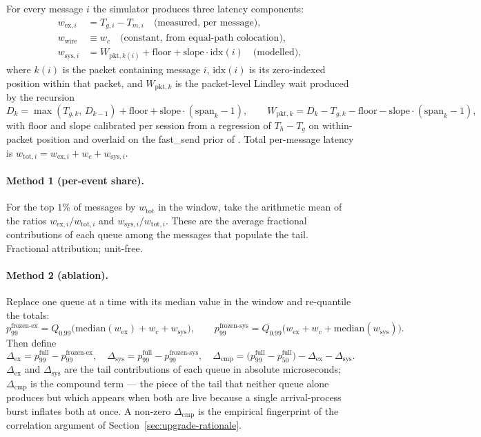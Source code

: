 \documentclass[11pt]{article}
\begin{document}
For every message $i$ the simulator produces three latency components:
\begin{align*}
w_{\mathrm{ex},i}   &= T_{g,i} - T_{m,i} \quad \text{(measured, per message)}, \\
w_{\mathrm{wire}}  &\equiv w_c \quad \text{(constant, from equal-path colocation)}, \\
w_{\mathrm{sys},i} &= W_{\mathrm{pkt},k(i)} + \text{floor} + \text{slope} \cdot \mathrm{idx}(i)\quad \text{(modelled)},
\end{align*}
where $k(i)$ is the packet containing message $i$, $\mathrm{idx}(i)$ is its zero-indexed position within that packet, and $W_{\mathrm{pkt},k}$ is the packet-level Lindley wait produced by the recursion
$$
D_k = \max(T_{g,k},\, D_{k-1}) + \text{floor} + \text{slope} \cdot (\text{span}_k - 1), \qquad W_{\mathrm{pkt},k} = D_k - T_{g,k} - \text{floor} - \text{slope}\cdot(\text{span}_k - 1),
$$
with floor and slope calibrated per session from a regression of $T_h - T_g$ on within-packet position and overlaid on the fast\_send prior of \citet{mayeski_actorhft}. Total per-message latency is $w_{\mathrm{tot},i} = w_{\mathrm{ex},i} + w_c + w_{\mathrm{sys},i}$.

\paragraph{Method 1 (per-event share).}
For the top $1\%$ of messages by $w_{\mathrm{tot}}$ in the window, take the arithmetic mean of the ratios $w_{\mathrm{ex},i}/w_{\mathrm{tot},i}$ and $w_{\mathrm{sys},i}/w_{\mathrm{tot},i}$. These are the average fractional contributions of each queue among the messages that populate the tail. Fractional attribution; unit-free.

\paragraph{Method 2 (ablation).}
Replace one queue at a time with its median value in the window and re-quantile the totals:
$$
p_{99}^{\text{frozen-ex}}  = Q_{0.99}\!\bigl(\mathrm{median}(w_{\mathrm{ex}}) + w_c + w_{\mathrm{sys}}\bigr), \qquad
p_{99}^{\text{frozen-sys}} = Q_{0.99}\!\bigl(w_{\mathrm{ex}} + w_c + \mathrm{median}(w_{\mathrm{sys}})\bigr).
$$
Then define
$$
\Delta_{\mathrm{ex}} = p_{99}^{\text{full}} - p_{99}^{\text{frozen-ex}}, \quad
\Delta_{\mathrm{sys}} = p_{99}^{\text{full}} - p_{99}^{\text{frozen-sys}}, \quad
\Delta_{\mathrm{cmp}} = \bigl(p_{99}^{\text{full}} - p_{50}^{\text{full}}\bigr) - \Delta_{\mathrm{ex}} - \Delta_{\mathrm{sys}}.
$$
$\Delta_{\mathrm{ex}}$ and $\Delta_{\mathrm{sys}}$ are the tail contributions of each queue in absolute microseconds; $\Delta_{\mathrm{cmp}}$ is the compound term --- the piece of the tail that neither queue alone produces but which appears when both are live because a single arrival-process burst inflates both at once. A non-zero $\Delta_{\mathrm{cmp}}$ is the empirical fingerprint of the correlation argument of Section~\ref{sec:upgrade-rationale}.
\end{document}
